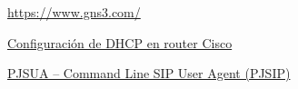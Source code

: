 \documentclass[letterpaper,12pt]{article}
\begin{document}
\begin{enumerate}[label={[\arabic*]}]
    \item \href{https://www.gns3.com/}{https://www.gns3.com/}
    \item \href{https://jmcristobal.com/es/2021/10/22/configure-dhcp-in-router-cisco/}{Configuración de DHCP en router Cisco}
    \item \href{https://docs.pjsip.org/en/latest/pjsua/pjsua.html}{PJSUA -- Command Line SIP User Agent (PJSIP)}
\end{enumerate}
\end{document}
